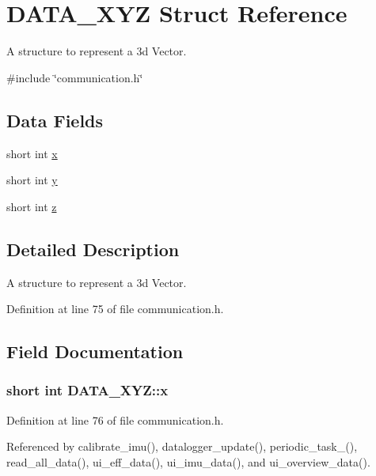 \hypertarget{structDATA__XYZ}{\section{D\-A\-T\-A\-\_\-\-X\-Y\-Z Struct Reference}
\label{structDATA__XYZ}
}


A structure to represent a 3d Vector.  




{\ttfamily \#include \char`\"{}communication.\-h\char`\"{}}

\subsection*{Data Fields}
\begin{DoxyCompactItemize}
\item 
short int \hyperlink{structDATA__XYZ_a54c1596e9f9969fd9c21e8458024ecfb}{x}
\item 
short int \hyperlink{structDATA__XYZ_a94bbb1c889bf53eb6a5fffa2b39322cf}{y}
\item 
short int \hyperlink{structDATA__XYZ_a69e89ab0ec6e5d72fc5d54f62cc07fb5}{z}
\end{DoxyCompactItemize}


\subsection{Detailed Description}
A structure to represent a 3d Vector. 

Definition at line 75 of file communication.\-h.



\subsection{Field Documentation}
\hypertarget{structDATA__XYZ_a54c1596e9f9969fd9c21e8458024ecfb}{
\subsubsection[{x}]{\setlength{\rightskip}{0pt plus 5cm}short int D\-A\-T\-A\-\_\-\-X\-Y\-Z\-::x}}\label{structDATA__XYZ_a54c1596e9f9969fd9c21e8458024ecfb}


Definition at line 76 of file communication.\-h.



Referenced by calibrate\-\_\-imu(), datalogger\-\_\-update(), periodic\-\_\-task\-\_(), read\-\_\-all\-\_\-data(), ui\-\_\-eff\-\_\-data(), ui\-\_\-imu\-\_\-data(), and ui\-\_\-overview\-\_\-data().

